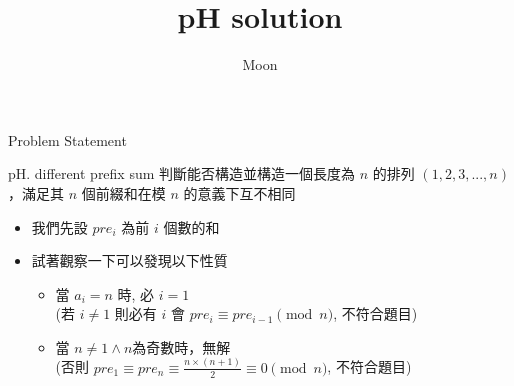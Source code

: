 \documentclass[notheorems,xcolor=dvipsnames]{beamer}
\title{pH solution}
\author{Moon}
\theoremstyle{definition}
\begin{document}
\begin{frame}
  \titlepage
\end{frame}



\begin{frame}[fragile]{\LARGE Problem Statement}
  \begin{block}{pH. different prefix sum}
    判斷能否構造並構造一個長度為 $n$ 的排列 $(1, 2, 3, ... , n)$，滿足其 $n$ 個前綴和在模 $n$ 的意義下互不相同
  \end{block} \pause
  \begin{itemize}
    \item <2-> 我們先設 $pre_i$ 為前 $i$ 個數的和
    \vspace{0.3cm}
    \item <3-> 試著觀察一下可以發現以下性質
    \vspace{0.3cm}
    \begin{itemize}
      \item 當 $a_i = n$ 時, 必 $i = 1$ \\
      (若 $i \neq 1$ 則必有 $i$ 會 $pre_i \equiv pre_{i - 1} \pmod n$, 不符合題目)
      \vspace{0.3cm}
      \item 當 $n \neq 1 \land n$為奇數時，無解 \\
      (否則 $pre_1 \equiv pre_n \equiv \frac{n \times (n + 1)}{2} \equiv 0 \pmod n$, 不符合題目)
    \end{itemize}
    
  \end{itemize}
\end{frame}
\end{document}

